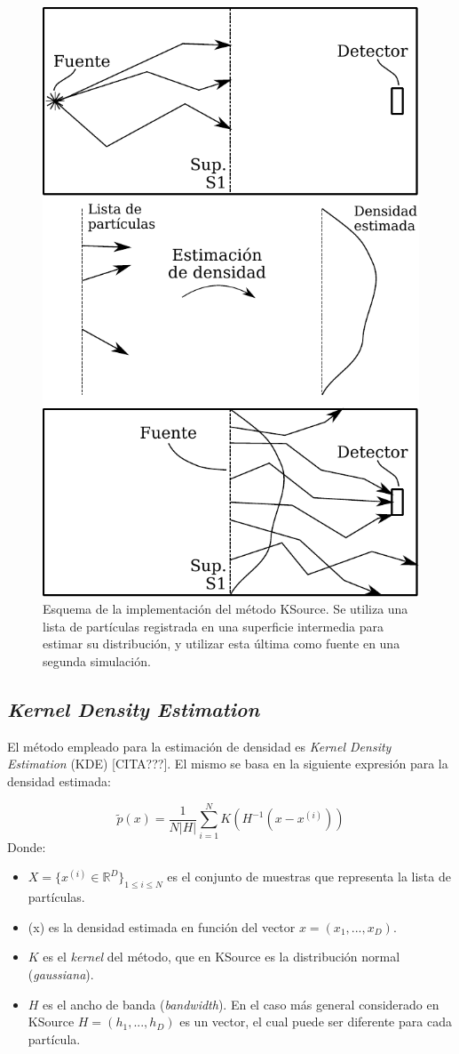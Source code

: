 \begin{figure}[htbp!]
    \centering
    \includegraphics[width=.7\textwidth]{figs/esquema_redvar.pdf}
    \caption{Esquema de la implementación del método KSource. Se utiliza una lista de partículas registrada en una superficie intermedia para estimar su distribución, y utilizar esta última como fuente en una segunda simulación.}
    \label{fig:esq_rv}
\end{figure}


\subsection{\emph{Kernel Density Estimation}}
\label{subsec:kde}

El método empleado para la estimación de densidad es \emph{Kernel Density Estimation} (KDE) [CITA???]. El mismo se basa en la siguiente expresión para la densidad estimada:

\begin{equation}
    \tilde{p}(x) = \frac{1}{N |H|} \sum_{i=1}^N K(H^{-1} (x-x^{(i)}))
    \label{eq:KDE}
\end{equation}
Donde:
\begin{itemize}
    \item $X = \{x^{(i)} \in \mathbb{R}^D\}_{1\leq i \leq N}$ es el conjunto de muestras que representa la lista de partículas.
    \item {}(x) es la densidad estimada en función del vector $x=(x_1,...,x_D)$.
    \item $K$ es el \emph{kernel} del método, que en KSource es la distribución normal (\emph{gaussiana}).
    \item $H$ es el ancho de banda (\emph{bandwidth}). En el caso más general considerado en KSource $H=(h_1,...,h_D)$ es un vector, el cual puede ser diferente para cada partícula.
\end{itemize}

